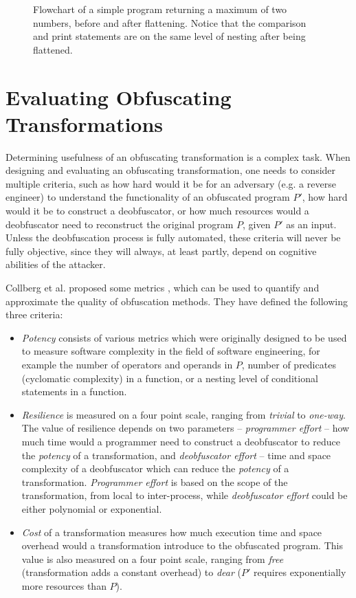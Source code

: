 \documentclass[
  digital, %
  notable,   %
  twoside, %
  nolof,     %
  nolot,     %
]{fithesis3}
\theoremstyle{definition}
\begin{document}
\begin{figure}
\begin{center}
\begin{minipage}{.6\textwidth}
        \end{minipage}
    \end{center}
    \caption{Flowchart of a simple program returning a maximum of two numbers, before and after flattening. Notice that the comparison and print statements are on the same level of nesting after being flattened.}
    \label{fig:flattening}
\end{figure}


\section{Evaluating Obfuscating Transformations} \label{sec:eval}
Determining usefulness of an obfuscating transformation is a complex task. When designing and evaluating an obfuscating transformation, one needs to consider multiple criteria, such as how hard would it be for an adversary (e.g. a reverse engineer) to understand the functionality of an obfuscated program $P'$, how hard would it be to construct a deobfuscator, or how much resources would a deobfuscator need to reconstruct the original program $P$, given $P'$ as an input. Unless the deobfuscation process is fully automated, these criteria will never be fully objective, since they will always, at least partly, depend on cognitive abilities of the attacker. 

Collberg et al. proposed some metrics \cite{taxonomy_obf}, which can be used to quantify and approximate the quality of obfuscation methods. They have defined the following three criteria: 
\begin{itemize}
    \item \textit{Potency} consists of various metrics which were originally designed to be used to measure software complexity in the field of software engineering, for example the number of operators and operands in $P$, number of predicates (cyclomatic complexity) in a function, or a nesting level of conditional statements in a function.
    
    \item \textit{Resilience} is measured on a four point scale, ranging from \textit{trivial} to \textit{one-way}. The value of resilience depends on two parameters -- \textit{programmer effort} -- how much time would a programmer need to construct a deobfuscator to reduce the \textit{potency} of a transformation, and \textit{deobfuscator effort} -- time and space complexity of a deobfuscator which can reduce the \textit{potency} of a transformation. \textit{Programmer effort} is based on the scope of the transformation, from local to inter-process, while \textit{deobfuscator effort} could be either polynomial or exponential.
    \item \textit{Cost} of a transformation measures how much execution time and space overhead would a transformation introduce to the obfuscated program. This value is also measured on a four point scale, ranging from \textit{free} (transformation adds a constant overhead) to \textit{dear} ($P'$ requires exponentially more resources than $P$).
\end{itemize}
\end{document}
